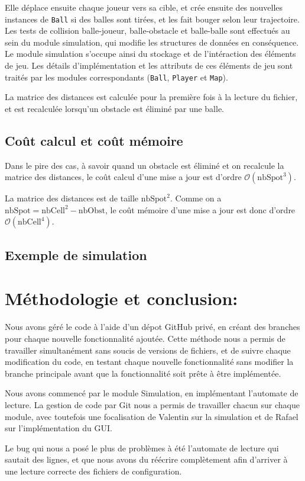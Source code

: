 \documentclass[a4paper, 11pt]{article}
\begin{document}
Elle déplace ensuite chaque joueur vers sa cible, et crée ensuite des nouvelles instances de \texttt{Ball} si des balles sont tirées, et les fait bouger selon leur trajectoire. 
Les tests de collision balle-joueur, balle-obstacle et balle-balle sont effectués au sein du module simulation, qui modifie les structures de données en conséquence. Le module simulation s'occupe ainsi du stockage et de l'intéraction des éléments de jeu. Les détails d'implémentation et les attributs de ces éléments de jeu sont traités par les modules correspondants (\texttt{Ball}, \texttt{Player} et \texttt{Map}).

La matrice des distances est calculée pour la première fois à la lecture du fichier, et est recalculée lorsqu'un obstacle est éliminé par une balle.

\subsection{Coût calcul et coût mémoire}

Dans le pire des cas, à savoir quand un obstacle est éliminé et on recalcule la matrice des distances, le coût calcul d'une mise a jour est d'ordre $\mathcal{O}(\text{nbSpot}^3)$. 

La matrice des distances est de taille $\text{nbSpot}^2$. Comme on a $\text{nbSpot} = \text{nbCell}^2 - \text{nbObst}$, le coût mémoire d'une mise a jour est donc d'ordre $\mathcal{O}(\text{nbCell}^4)$.

\subsection{Exemple de simulation}

\section{Méthodologie et conclusion:}

Nous avons géré le code à l'aide d'un dépot GitHub privé, en créant des branches pour chaque nouvelle fonctionnalité ajoutée. Cette méthode nous a permis de travailler simultanément sans soucis de versions de fichiers, et de suivre chaque modification du code, en testant chaque nouvelle fonctionnalité sans modifier la branche principale avant que la fonctionnalité soit prête à être implémentée.

Nous avons commencé par le module Simulation, en implémentant l'automate de lecture. La gestion de code par Git nous a permis de travailler chacun sur chaque module, avec toutefois une focalisation de Valentin sur la simulation et de Rafael sur l'implémentation du GUI.

Le bug qui nous a posé le plus de problèmes à été l'automate de lecture qui sautait des lignes, et que nous avons du réécrire complètement afin d'arriver à une lecture correcte des fichiers de configuration.
\end{document}
